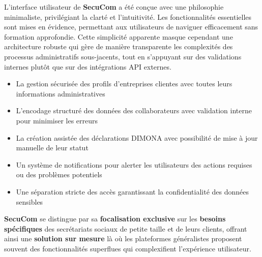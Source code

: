 \begin{note}
L'interface utilisateur de \textbf{SecuCom} a été conçue avec une philosophie minimaliste, privilégiant la clarté et l'intuitivité. Les fonctionnalités essentielles sont mises en évidence, permettant aux utilisateurs de naviguer efficacement sans formation approfondie. Cette simplicité apparente masque cependant une architecture robuste qui gère de manière transparente les complexités des processus administratifs sous-jacents, tout en s'appuyant sur des validations internes plutôt que sur des intégrations API externes.
\end{note}

\begin{tcolorbox}[
  title={\textbf{Fonctionnalités clés de SecuCom}},
  colback=blue!5!white,
  colframe=primarycolor,
  fonttitle=\bfseries,
  boxrule=0.5mm,
  arc=2mm,
  left=6mm,
  right=6mm,
  top=6mm,
  bottom=6mm
]
\begin{itemize}[leftmargin=*,label=\textcolor{darkgray}{$\bullet$},itemsep=0.3em]
  \item La gestion sécurisée des profils d'entreprises clientes avec toutes leurs informations administratives
  \item L'encodage structuré des données des collaborateurs avec validation interne pour minimiser les erreurs
  \item La création assistée des déclarations DIMONA avec possibilité de mise à jour manuelle de leur statut
  \item Un système de notifications pour alerter les utilisateurs des actions requises ou des problèmes potentiels
  \item Une séparation stricte des accès garantissant la confidentialité des données sensibles
\end{itemize}
\end{tcolorbox}

\vspace{0.5cm}

\noindent \textbf{SecuCom} se distingue par sa \textbf{focalisation exclusive} sur les \textbf{besoins spécifiques} des secrétariats sociaux de petite taille et de leurs clients, offrant ainsi une \textbf{solution sur mesure} là où les plateformes généralistes proposent souvent des fonctionnalités superflues qui complexifient l'expérience utilisateur.

\vspace{0.5cm}

